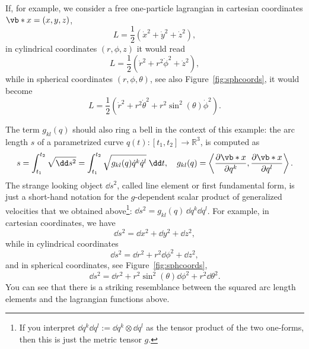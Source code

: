 \documentclass[english,fontsize=11pt,paper=b5]{scrbook}
\theoremstyle{definition}
\begin{document}
    If, for example, we consider a free one-particle lagrangian in cartesian coordinates $\vb*{x} = (x,y,z)$,
    \begin{equation}
      L = \frac 12 (\dot x^2 + \dot y^2 + \dot z^2),
    \end{equation}
    in cylindrical coordinates $(r,\phi,z)$ it would read
    \begin{equation}
      L = \frac 12 (\dot r^2 + r^2 \dot \phi^2 + \dot z^2),
    \end{equation}
    while in spherical coordinates $(r,\phi,\theta)$, see also Figure~\ref{fig:sphcoords}, it would become
    \begin{equation}
      L = \frac 12 (\dot r^2 + r^2 \dot \theta^2 + r^2 \sin^2(\theta) \dot \phi^2).
    \end{equation}

    The term $g_{kl} (q)$ should also ring a bell in the context of this example: the arc length $s$ of a parametrized curve $q(t) : [t_1,t_2] \to \mathbb{R}^3$, is computed as
    \begin{equation}\label{eq:arclen}
      \begin{aligned}
        s = \int_{t_1}^{t_2} \sqrt{\dd s^2} = \int_{t_1}^{t_2} \sqrt{g_{kl}(q)\dot q^k \dot q^l} \;\dd t,\quad
        g_{kl} (q) = \left\langle\frac{\partial\vb*{x}}{\partial q^k}, \frac{\partial \vb*{x}}{\partial q^l}\right\rangle.
      \end{aligned}
    \end{equation}
    The strange looking object $\dd s^2$, called line element or first fundamental form, is just a short-hand notation for the $g$-dependent scalar product of generalized velocities that we obtained above\footnote{If you interpret $\dd q^k \dd q^l := \dd q^k \otimes \dd q^l$ as the tensor product of the two one-forms, then this is just the metric tensor $g$.}: $\dd s^2 = g_{kl}(q)\, \dd q^k \dd q^l$.
    For example, in cartesian coordinates, we have
    \begin{equation}
      \dd s^2 = \dd x^2 + \dd y^2 + \dd z^2,
    \end{equation}
    while in cylindrical coordinates
    \begin{equation}
      \dd s^2 = \dd r^2 + r^2 \dd \phi^2 + \dd z^2,
    \end{equation}
    and in spherical coordinates, see Figure~\ref{fig:sphcoords},
    \begin{equation}\label{eq:spharc}
      \dd s^2 = \dd r^2 + r^2 \sin^2(\theta) \dd \phi^2 + r^2 \dd \theta^2.
    \end{equation}
    You can see that there is a striking resemblance between the squared arc length elements and the lagrangian functions above. \medskip
\end{document}
